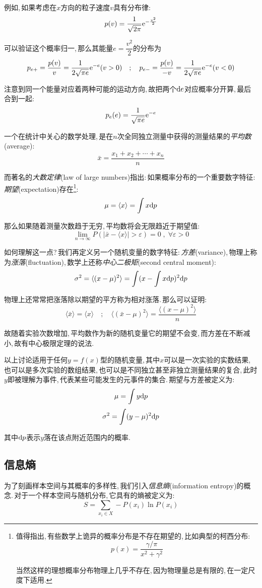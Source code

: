 例如,\,如果考虑在\(x\)方向的粒子速度\(v\)具有分布律:
\[p(v)=\frac{1}{\sqrt{2\pi}}{\rm e}^{-\frac{v^2}{2}}\]

可以验证这个概率归一,\,那么其能量\(e=\dfrac{v^2}{2}\)的分布为
\[p_{e+}=\frac{p(v)}{v}=\frac{1}{2\sqrt{\pi e}}{\rm e}^{-e}(v>0)\quad ;\quad p_{e-}=\frac{p(v)}{-v}=\frac{1}{2\sqrt{\pi e}}{\rm e}^{-e}(v<0)\]

注意到同一个能量对应着两种可能的运动方向,\,故把两个\(\textrm{d} e\)对应概率分开算,\,最后合到一起:
\[p_e(e)=\frac{1}{\sqrt{\pi e}}{\rm e}^{-e}\]

一个在统计中关心的数学处理,\,是在\(n\)次全同独立测量中获得的测量结果的\emph{平均数}(average):
\[\bar{x}=\frac{x_1+x_2+\cdots+x_n}{n}\]

而著名的\emph{大数定律}(law of large numbers)指出:\,如果概率分布的一个重要数字特征:\,\emph{期望}(expectation)存在\footnote{值得指出,\,有些数学上诡异的概率分布是不存在期望的,\,比如典型的柯西分布:
\[p(x)=\frac{\gamma/\pi}{x^2+\gamma^2}\]

当然这样的理想概率分布物理上几乎不存在,\,因为物理量总是有限的,\,在一定尺度下适用.}:
\[\mu=\langle x\rangle=\int x\textrm{d} p\]

那么如果随着测量次数趋于无穷,\,平均数将会无限趋近于期望值:
\[\lim_{n\to \infty}P(|\bar{x}-\langle x\rangle|>\varepsilon)=0\; , \; \forall \varepsilon>0\]

如何理解这一点?\,我们再定义另一个随机变量的数字特征:\,\emph{方差}(variance),\,物理上称为\emph{涨落}(fluctuation),\,数学上还称\emph{中心二极矩}(second central moment):
\[\sigma^2=\langle(x-\mu)^2\rangle=\int(x-\int x\textrm{d} p)^2\textrm{d} p\]

物理上还常常把涨落除以期望的平方称为相对涨落.\,那么可以证明:
\[\langle\bar{x}\rangle=\langle x\rangle\quad ;\quad \langle(\bar{x}-\mu)^2\rangle=\frac{\langle(x-\mu)^2\rangle}{n}\]

故随着实验次数增加,\,平均数作为新的随机变量它的期望不会变,\,而方差在不断减小,\,故有中心极限定理的说法.

以上讨论适用于任何\(y=f(x)\)型的随机变量,\,其中\(x\)可以是一次实验的实数结果,\,也可以是多次实验的数组结果,\,也可以是不同独立甚至非独立测量结果的复合,\,此时\(y\)即被理解为事件,\,代表某些可能发生的元事件的集合.\,期望与方差被定义为:
\[\mu=\int y\textrm{d} p\]
\[\sigma^2=\int (y-\mu)^2\textrm{d} p\]

其中\(\textrm{d} p\)表示\(y\)落在该点附近范围内的概率.

\subsection{信息熵}
为了刻画样本空间与其概率的多样性,\,我们引入\emph{信息熵}(information entropy)的概念.\,对于一个样本空间与随机分布,\,它具有的熵被定义为:
\[S=\sum_{x_i\in X}-P(x_i)\ln P(x_i)\]

